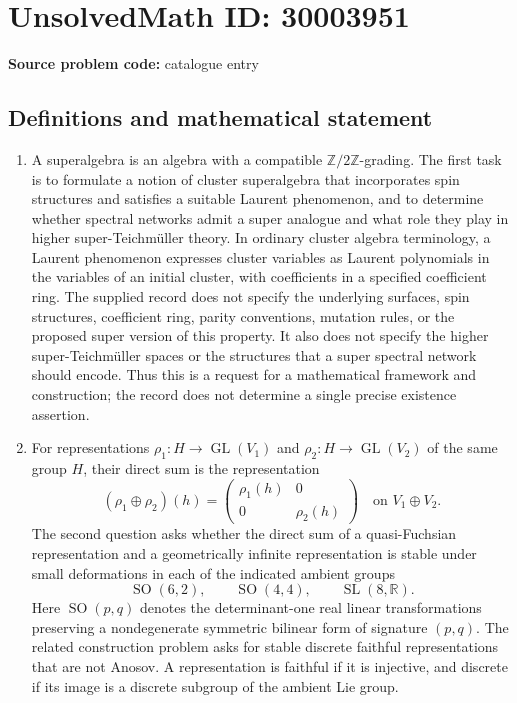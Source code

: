 \documentclass[11pt]{article}
\newcommand{\Z}{\mathbb{Z}}
\newcommand{\R}{\mathbb{R}}
\begin{document}
\section*{UnsolvedMath ID: 30003951}
\textbf{Source problem code:} catalogue entry
\subsection{Definitions and mathematical statement}
\begin{enumerate}
\item A superalgebra is an algebra with a compatible \(\Z/2\Z\)-grading. The first task is to formulate a notion of cluster superalgebra that incorporates spin structures and satisfies a suitable Laurent phenomenon, and to determine whether spectral networks admit a super analogue and what role they play in higher super-Teichmüller theory. In ordinary cluster algebra terminology, a Laurent phenomenon expresses cluster variables as Laurent polynomials in the variables of an initial cluster, with coefficients in a specified coefficient ring. The supplied record does not specify the underlying surfaces, spin structures, coefficient ring, parity conventions, mutation rules, or the proposed super version of this property. It also does not specify the higher super-Teichmüller spaces or the structures that a super spectral network should encode. Thus this is a request for a mathematical framework and construction; the record does not determine a single precise existence assertion.

\item For representations \(\rho_1:H\to\operatorname{GL}(V_1)\) and \(\rho_2:H\to\operatorname{GL}(V_2)\) of the same group \(H\), their direct sum is the representation
\[
(\rho_1\oplus\rho_2)(h)=\begin{pmatrix}\rho_1(h)&0\\0&\rho_2(h)\end{pmatrix}
\quad\text{on }V_1\oplus V_2.
\]
The second question asks whether the direct sum of a quasi-Fuchsian representation and a geometrically infinite representation is stable under small deformations in each of the indicated ambient groups
\[
\operatorname{SO}(6,2),\qquad \operatorname{SO}(4,4),\qquad \operatorname{SL}(8,\R).
\]
Here \(\operatorname{SO}(p,q)\) denotes the determinant-one real linear transformations preserving a nondegenerate symmetric bilinear form of signature \((p,q)\). The related construction problem asks for stable discrete faithful representations that are not Anosov. A representation is faithful if it is injective, and discrete if its image is a discrete subgroup of the ambient Lie group.


\end{enumerate}
\end{document}

